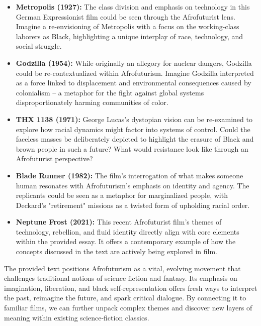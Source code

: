 \documentclass[11pt,fleqn]{book} %
\begin{document}
\begin{itemize}
\item \textbf{Metropolis (1927):} The class division and emphasis on technology in this German Expressionist film could be seen through the Afrofuturist lens. Imagine a re-envisioning of Metropolis with a focus on the working-class laborers as Black, highlighting a unique interplay of race, technology, and social struggle.  

\item \textbf{Godzilla (1954):} While originally an allegory for nuclear dangers, Godzilla could be re-contextualized within Afrofuturism. Imagine  Godzilla interpreted as a force linked to displacement and environmental consequences caused by colonialism –  a metaphor for the fight against global systems disproportionately harming communities of color. 

\item \textbf{THX 1138 (1971):}  George Lucas's dystopian vision can be re-examined to explore how racial dynamics might factor into  systems of control. Could the faceless masses be deliberately depicted to highlight the erasure of  Black and brown people in such a future? What would resistance look like through an Afrofuturist perspective?

\item \textbf{Blade Runner (1982):} The film's interrogation of what makes someone human resonates  with  Afrofuturism's emphasis on identity and agency. The replicants could be seen as a metaphor for marginalized people, with Deckard's "retirement" missions as a twisted form of upholding racial order. 

\item \textbf{Neptune Frost (2021):} This recent Afrofuturist film's themes of technology, rebellion, and fluid identity directly align with core elements within the provided essay. It offers a contemporary example of how the concepts discussed in the text are actively being explored in film. 
\end{itemize}

\vspace{5pt}

The provided text positions Afrofuturism as a vital, evolving movement that challenges traditional notions of science fiction and fantasy. Its emphasis on imagination, liberation, and black self-representation offers fresh ways to interpret the past, reimagine the future, and spark critical dialogue. By connecting it to familiar films, we can further unpack complex themes and discover new layers of meaning within existing science-fiction classics. 
\end{document}
